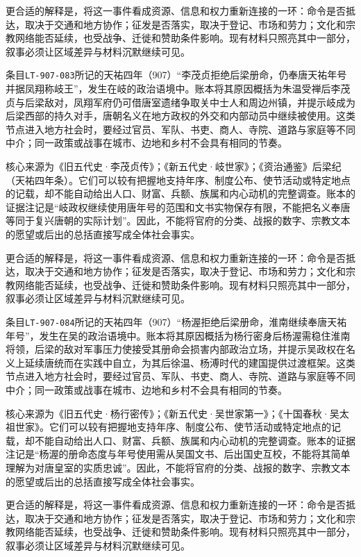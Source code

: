 更合适的解释是，将这一事件看成资源、信息和权力重新连接的一环：命令是否抵达，取决于交通和地方协作；征发是否落实，取决于登记、市场和劳力；文化和宗教网络能否延续，也受战争、迁徙和赞助条件影响。现有材料只照亮其中一部分，叙事必须让区域差异与材料沉默继续可见。

条目\texttt{LT-907-083}所记的天祐四年（907）“李茂贞拒绝后梁册命，仍奉唐天祐年号并据凤翔称岐王”，发生在岐的政治语境中。账本将其原因概括为朱温受禅后李茂贞与后梁敌对，凤翔军府仍可借唐室遗绪争取关中士人和周边州镇，并提示岐成为后梁西部的持久对手，唐朝名义在地方政权的外交和内部动员中继续被使用。这类节点进入地方社会时，要经过官员、军队、书吏、商人、寺院、道路与家庭等不同中介；同一政策或战事在城市、边地和乡村不会具有相同的节奏。

核心来源为《旧五代史·李茂贞传》；《新五代史·岐世家》；《资治通鉴》后梁纪（天祐四年条）。它们可以较有把握地支持年序、制度公布、使节活动或特定地点的记载，却不能自动给出人口、财富、兵额、族属和内心动机的完整调查。账本的证据注记是“岐政权继续使用唐年号的范围和文书实物保存有限，不能把名义奉唐等同于复兴唐朝的实际计划”。因此，不能将官府的分类、战报的数字、宗教文本的愿望或后出的总括直接写成全体社会事实。

更合适的解释是，将这一事件看成资源、信息和权力重新连接的一环：命令是否抵达，取决于交通和地方协作；征发是否落实，取决于登记、市场和劳力；文化和宗教网络能否延续，也受战争、迁徙和赞助条件影响。现有材料只照亮其中一部分，叙事必须让区域差异与材料沉默继续可见。

条目\texttt{LT-907-084}所记的天祐四年（907）“杨渥拒绝后梁册命，淮南继续奉唐天祐年号”，发生在吴的政治语境中。账本将其原因概括为杨行密身后杨渥需稳住淮南将领，后梁的敌对军事压力使接受其册命会损害内部政治立场，并提示吴政权在名义上延续唐统而在实践中自立，为其后徐温、杨溥时代的建国提供过渡框架。这类节点进入地方社会时，要经过官员、军队、书吏、商人、寺院、道路与家庭等不同中介；同一政策或战事在城市、边地和乡村不会具有相同的节奏。

核心来源为《旧五代史·杨行密传》；《新五代史·吴世家第一》；《十国春秋·吴太祖世家》。它们可以较有把握地支持年序、制度公布、使节活动或特定地点的记载，却不能自动给出人口、财富、兵额、族属和内心动机的完整调查。账本的证据注记是“杨渥的册命态度与年号使用需从吴国文书、后出国史互校，不能将其简单理解为对唐皇室的实质忠诚”。因此，不能将官府的分类、战报的数字、宗教文本的愿望或后出的总括直接写成全体社会事实。

更合适的解释是，将这一事件看成资源、信息和权力重新连接的一环：命令是否抵达，取决于交通和地方协作；征发是否落实，取决于登记、市场和劳力；文化和宗教网络能否延续，也受战争、迁徙和赞助条件影响。现有材料只照亮其中一部分，叙事必须让区域差异与材料沉默继续可见。

